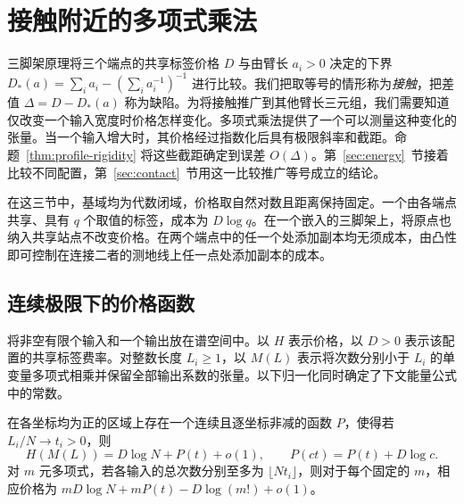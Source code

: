 \section{接触附近的多项式乘法}\label{sec:profiles}

三脚架原理将三个端点的共享标签价格 $D$ 与由臂长 $a_i>0$ 决定的下界 $D_*(a)=\sum_i a_i-(\sum_i a_i^{-1})^{-1}$ 进行比较。我们把取等号的情形称为\emph{接触}，把差值 $\Delta=D-D_*(a)$ 称为缺陷。为将接触推广到其他臂长三元组，我们需要知道仅改变一个输入宽度时价格怎样变化。多项式乘法提供了一个可以测量这种变化的张量。当一个输入增大时，其价格经过指数化后具有极限斜率和截距。命题~\ref{thm:profile-rigidity} 将这些截距确定到误差 $O(\Delta)$。第~\ref{sec:energy}~节接着比较不同配置，第~\ref{sec:contact}~节用这一比较推广等号成立的结论。

在这三节中，基域均为代数闭域，价格取自然对数且距离保持固定。一个由各端点共享、具有 $q$ 个取值的标签，成本为 $D\log q$。在一个嵌入的三脚架上，将原点也纳入共享站点不改变价格。在两个端点中的任一个处添加副本均无须成本，由凸性即可控制在连接二者的测地线上任一点处添加副本的成本。

\subsection{连续极限下的价格函数}
将非空有限个输入和一个输出放在谱空间中。以 $H$ 表示价格，以 $D>0$ 表示该配置的共享标签费率。对整数长度 $L_i\ge1$，以 $M(L)$ 表示将次数分别小于 $L_i$ 的单变量多项式相乘并保留全部输出系数的张量。以下归一化同时确定了下文能量公式中的常数。

\begin{lemma}\label{lem:continuum-profile}
在各坐标均为正的区域上存在一个连续且逐坐标非减的函数 $P$，使得若 $L_i/N\to t_i>0$，则
\[
 H(M(L))=D\log N+P(t)+o(1),\qquad P(ct)=P(t)+D\log c.
\]
对 $m$ 元多项式，若各输入的总次数分别至多为 $\lfloor Nt_i\rfloor$，则对于每个固定的 $m$，相应价格为 $mD\log N+mP(t)-D\log(m!)+o(1)$。
\end{lemma}

